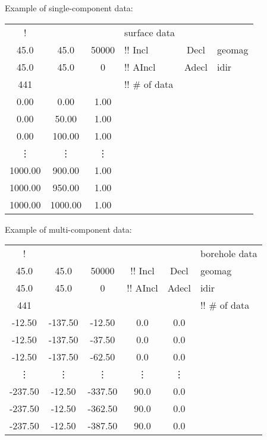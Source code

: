 Example of single-component data:
\begin{fileExample}
\begin{tabular}{|ccclcl|}
\hline
! & & & surface data  & & \\
45.0 & 45.0 & 50000 & !! Incl & Decl & geomag\\
45.0 & 45.0 & 0 & !! AIncl & Adecl & idir \\
441 & & & !! \# of data & & \\
0.00 & 0.00 & 1.00   & & & \\
0.00 & 50.00 & 1.00  & & &\\
0.00 & 100.00 & 1.00 & & & \\
\vdots & \vdots & \vdots & & & \\
1000.00 & 900.00 & 1.00 & & &\\
1000.00 & 950.00 & 1.00 & & &\\
1000.00 & 1000.00 & 1.00 & & & \\
\hline
\end{tabular}
\end{fileExample}
%
Example of multi-component data:
\begin{fileExample}
\begin{tabular}{|cccccl|}
\hline
! & & &  & & borehole data \\
45.0 & 45.0 & 50000 & !! Incl & Decl & geomag\\
45.0 & 45.0 & 0 & !! AIncl & Adecl & idir \\
441 & & & & & !! \# of data \\
-12.50 & -137.50 & -12.50 & 0.0 & 0.0 & \\
-12.50 & -137.50 & -37.50 & 0.0 & 0.0 & \\
-12.50 & -137.50 & -62.50 & 0.0 & 0.0 & \\
\vdots & \vdots & \vdots & \vdots & \vdots & \\
-237.50 & -12.50 & -337.50 & 90.0 & 0.0 & \\
-237.50 & -12.50 & -362.50 & 90.0 & 0.0 & \\
-237.50 & -12.50 & -387.50 & 90.0 & 0.0 & \\
\hline
\end{tabular}
\end{fileExample}